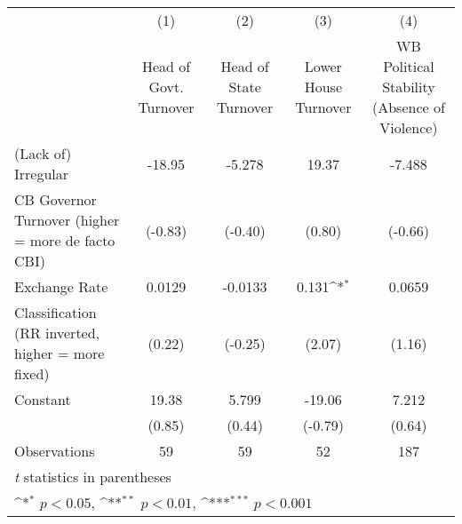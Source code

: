 {
\def\sym#1{\ifmmode^{#1}\else\(^{#1}\)\fi}
\begin{tabular}{l*{4}{c}}
\hline\hline
                    &\multicolumn{1}{c}{(1)}&\multicolumn{1}{c}{(2)}&\multicolumn{1}{c}{(3)}&\multicolumn{1}{c}{(4)}\\
                    &\multicolumn{1}{c}{Head of Govt. Turnover}&\multicolumn{1}{c}{Head of State Turnover}&\multicolumn{1}{c}{Lower House Turnover}&\multicolumn{1}{c}{WB Political Stability (Absence of Violence)}\\
\hline
(Lack of) Irregular &      -18.95         &      -5.278         &       19.37         &      -7.488         \\
CB Governor Turnover (higher = more de facto CBI)&     (-0.83)         &     (-0.40)         &      (0.80)         &     (-0.66)         \\
[1em]
Exchange Rate       &      0.0129         &     -0.0133         &       0.131\sym{*}  &      0.0659         \\
Classification (RR inverted, higher = more fixed)&      (0.22)         &     (-0.25)         &      (2.07)         &      (1.16)         \\
[1em]
Constant            &       19.38         &       5.799         &      -19.06         &       7.212         \\
                    &      (0.85)         &      (0.44)         &     (-0.79)         &      (0.64)         \\
\hline
Observations        &          59         &          59         &          52         &         187         \\
\hline\hline
\multicolumn{5}{l}{\footnotesize \textit{t} statistics in parentheses}\\
\multicolumn{5}{l}{\footnotesize \sym{*} \(p<0.05\), \sym{**} \(p<0.01\), \sym{***} \(p<0.001\)}\\
\end{tabular}
}
